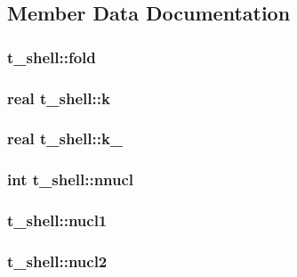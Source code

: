 \subsection{\-Member \-Data \-Documentation}
\hypertarget{structt__shell_a8506f8407c00bd1f4c3c6867ee619d93}{
\subsubsection[{fold}]{ {\bf t\-\_\-shell\-::fold}}}\label{structt__shell_a8506f8407c00bd1f4c3c6867ee619d93}
\hypertarget{structt__shell_a3d62b51f5083590fb29cba401af6e051}{
\subsubsection[{k}]{\setlength{\rightskip}{0pt plus 5cm}real {\bf t\-\_\-shell\-::k}}}\label{structt__shell_a3d62b51f5083590fb29cba401af6e051}
\hypertarget{structt__shell_a0684ff3cff2bb4d1a94c3bba915f0bc5}{
\subsubsection[{k\-\_\-1}]{\setlength{\rightskip}{0pt plus 5cm}real {\bf t\-\_\-shell\-::k\-\_}}}\label{structt__shell_a0684ff3cff2bb4d1a94c3bba915f0bc5}
\hypertarget{structt__shell_acc68149d18898e99ea5565763839b471}{
\subsubsection[{nnucl}]{\setlength{\rightskip}{0pt plus 5cm}int {\bf t\-\_\-shell\-::nnucl}}}\label{structt__shell_acc68149d18898e99ea5565763839b471}
\hypertarget{structt__shell_ac796693219c4cea681c9cb86b223b387}{
\subsubsection[{nucl1}]{ {\bf t\-\_\-shell\-::nucl1}}}\label{structt__shell_ac796693219c4cea681c9cb86b223b387}
\hypertarget{structt__shell_a1222ad3f1e740d5e88c5b48b1b48ef0c}{
\subsubsection[{nucl2}]{ {\bf t\-\_\-shell\-::nucl2}}}\label{structt__shell_a1222ad3f1e740d5e88c5b48b1b48ef0c}
